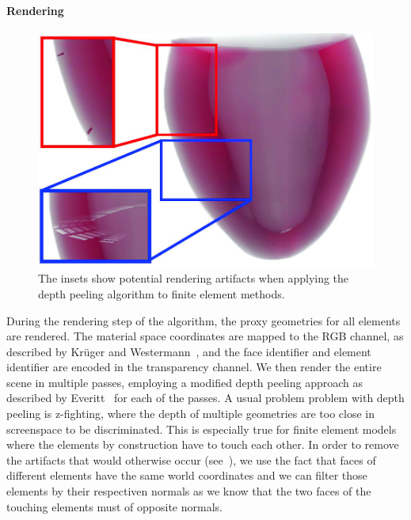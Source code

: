 \paragraph{Rendering}
\begin{figure}
    \centering
    \includegraphics[width=0.5\linewidth]{figures/contributions/fem/heartfine.jpg}
    \caption{The insets show potential rendering artifacts when applying the depth peeling algorithm to finite element methods.}
    \label{contribution:medbio:fem:peeling}
\end{figure}
During the rendering step of the algorithm, the proxy geometries for all elements are rendered. The material space coordinates are mapped to the RGB channel, as described by Kr\"uger and Westermann~\cite{kruger2003acceleration}, and the face identifier and element identifier are encoded in the transparency channel. We then render the entire scene in multiple passes, employing a modified depth peeling approach as described by Everitt~\cite{everitt2001interactive} for each of the passes. A usual problem problem with depth peeling is z-fighting, where the depth of multiple geometries are too close in screenspace to be discriminated. This is especially true for finite element models where the elements by construction have to touch each other. In order to remove the artifacts that would otherwise occur (see~), we use the fact that faces of different elements have the same world coordinates and we can filter those elements by their respectiven normals as we know that the two faces of the touching elements must of opposite normals.

